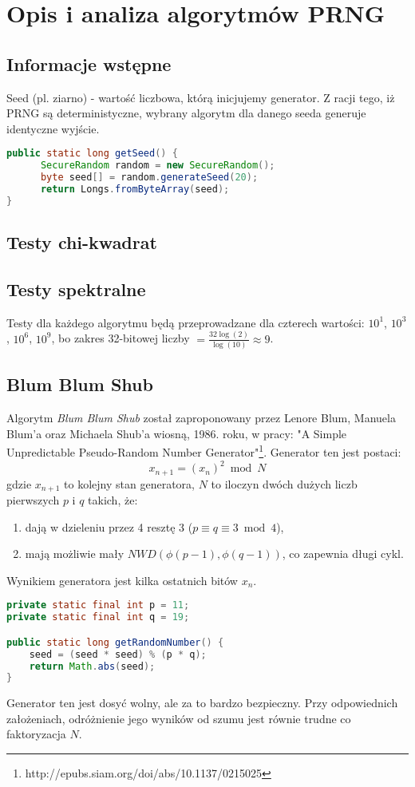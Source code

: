 \documentclass[a4paper, 11pt]{article} %
\begin{document}
\section{Opis i analiza algorytmów PRNG}
\subsection*{Informacje wstępne}
Seed (pl. ziarno) - wartość liczbowa, którą inicjujemy generator. Z racji tego, iż PRNG są deterministyczne, wybrany algorytm dla danego seeda generuje identyczne wyjście. 
\begin{lstlisting}[style=mystyle, language=java, frame=single, caption = Przykładowa funkcja generująca seeda]
public static long getSeed() {
      SecureRandom random = new SecureRandom();
      byte seed[] = random.generateSeed(20);
      return Longs.fromByteArray(seed);
}
\end{lstlisting}
\subsection*{Testy chi-kwadrat}
\subsection*{Testy spektralne}
Testy dla każdego algorytmu będą przeprowadzane dla czterech wartości: $10^{1}$, $10^{3}$, $10^{6}$, $10^{9}$, bo zakres 32-bitowej liczby $= \frac{32\log(2)}{\log(10)} \approx 9$.

\subsection{Blum Blum Shub}
Algorytm \textit{Blum Blum Shub} został zaproponowany przez Lenore Blum, Manuela Blum'a oraz Michaela Shub'a wiosną, 1986. roku, w pracy: "A Simple Unpredictable Pseudo-Random Number Generator"\footnote{http://epubs.siam.org/doi/abs/10.1137/0215025}. Generator ten jest postaci:
\[ x_{n+1} = (x_{n})^2 \bmod N \]
gdzie $x_{n+1}$ to kolejny stan generatora, $N$ to iloczyn dwóch dużych liczb pierwszych $p$ i $q$ takich, że:
\begin{enumerate}
\item dają w dzieleniu przez 4 resztę 3 ($p\equiv q \equiv 3 \bmod 4$),
\item mają możliwie mały $NWD(\phi(p-1), \phi(q-1))$, co zapewnia długi cykl.
\end{enumerate}
Wynikiem generatora jest kilka ostatnich bitów $x_{n}$.
\begin{lstlisting}[style=mystyle, language=java, frame=single, caption = Generowanie następnej liczby pseudolosowej przez BBS]
private static final int p = 11;
private static final int q = 19;

public static long getRandomNumber() {
    seed = (seed * seed) % (p * q);
    return Math.abs(seed);
}
\end{lstlisting}
Generator ten jest dosyć wolny, ale za to bardzo bezpieczny. Przy odpowiednich założeniach, odróżnienie jego wyników od szumu jest równie trudne co faktoryzacja $N$.
\end{document}
